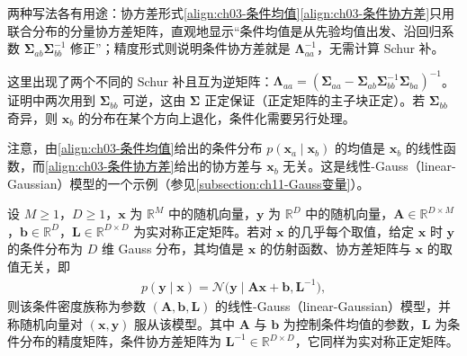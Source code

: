 \documentclass[../../main.tex]{subfiles}
\begin{document}
\begin{remark}
两种写法各有用途：协方差形式\eqref{align:ch03-条件均值}\eqref{align:ch03-条件协方差}只用联合分布的分量协方差矩阵，直观地显示“条件均值是从先验均值出发、沿回归系数 $\boldsymbol{\Sigma}_{ab}\boldsymbol{\Sigma}_{bb}^{-1}$ 修正”；精度形式则说明条件协方差就是 $\boldsymbol{\Lambda}_{aa}^{-1}$，无需计算 Schur 补。

这里出现了两个不同的 Schur 补且互为逆矩阵：$\boldsymbol{\Lambda}_{aa}=(\boldsymbol{\Sigma}_{aa}-\boldsymbol{\Sigma}_{ab}\boldsymbol{\Sigma}_{bb}^{-1}\boldsymbol{\Sigma}_{ba})^{-1}$。证明中两次用到 $\boldsymbol{\Sigma}_{bb}$ 可逆，这由 $\boldsymbol{\Sigma}$ 正定保证（正定矩阵的主子块正定）。若 $\boldsymbol{\Sigma}_{bb}$ 奇异，则 $\boldsymbol{x}_b$ 的分布在某个方向上退化，条件化需要另行处理。
\end{remark}

注意，由\eqref{align:ch03-条件均值}给出的条件分布 $p(\boldsymbol{x}_{a}\mid\boldsymbol{x}_{b})$ 的均值是 $\boldsymbol{x}_{b}$ 的线性函数，而\eqref{align:ch03-条件协方差}给出的协方差与 $\boldsymbol{x}_{b}$ 无关。这是线性-Gauss（linear-Gaussian）模型的一个示例（参见\cref{subsection:ch11-Gauss变量}）。

\begin{definition}[线性-Gauss 模型]\label{definition:ch03-线性Gauss模型}
设 $M\geqslant1$，$D\geqslant1$，$\boldsymbol{x}$ 为 $\mathbb{R}^{M}$ 中的随机向量，$\boldsymbol{y}$ 为 $\mathbb{R}^{D}$ 中的随机向量，$\boldsymbol{A}\in\mathbb{R}^{D\times M}$，$\boldsymbol{b}\in\mathbb{R}^{D}$，$\boldsymbol{L}\in\mathbb{R}^{D\times D}$ 为实对称正定矩阵。若对 $\boldsymbol{x}$ 的几乎每个取值，给定 $\boldsymbol{x}$ 时 $\boldsymbol{y}$ 的条件分布为 $D$ 维 Gauss 分布，其均值是 $\boldsymbol{x}$ 的仿射函数、协方差矩阵与 $\boldsymbol{x}$ 的取值无关，即
\begin{align}
p(\boldsymbol{y}\mid\boldsymbol{x})=\mathcal{N}\bigl(\boldsymbol{y}\mid\boldsymbol{A}\boldsymbol{x}+\boldsymbol{b},\boldsymbol{L}^{-1}\bigr),
\label{align:ch03-线性Gauss模型}
\end{align}
则该条件密度族称为参数 $(\boldsymbol{A},\boldsymbol{b},\boldsymbol{L})$ 的线性-Gauss（linear-Gaussian）模型，并称随机向量对 $(\boldsymbol{x},\boldsymbol{y})$ 服从该模型。其中 $\boldsymbol{A}$ 与 $\boldsymbol{b}$ 为控制条件均值的参数，$\boldsymbol{L}$ 为条件分布的精度矩阵，条件协方差矩阵为 $\boldsymbol{L}^{-1}\in\mathbb{R}^{D\times D}$，它同样为实对称正定矩阵。
\end{definition}
\end{document}
